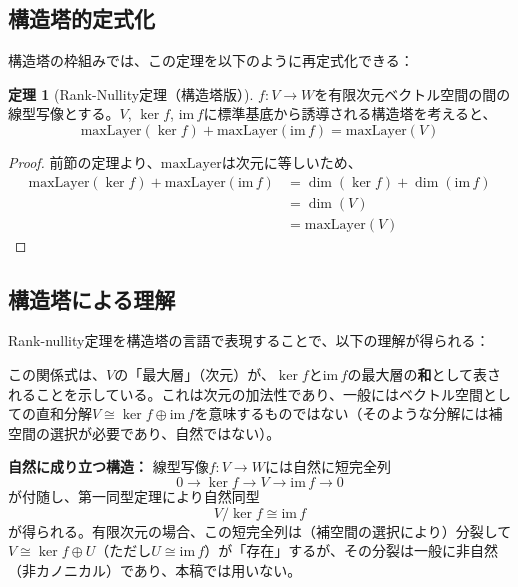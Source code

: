 \documentclass[a4paper,11pt]{ltjsarticle}
\theoremstyle{definition}
\newtheorem{theorem}[definition]{定理}
\begin{document}
\subsection{構造塔的定式化}

構造塔の枠組みでは、この定理を以下のように再定式化できる：

\begin{theorem}[Rank-Nullity定理（構造塔版）]\label{thm:rank_nullity_tower}
$f : V \to W$を有限次元ベクトル空間の間の線型写像とする。$V$, $\ker f$, $\mathrm{im}\, f$に標準基底から誘導される構造塔を考えると、
\[
\mathrm{maxLayer}(\ker f) + \mathrm{maxLayer}(\mathrm{im}\, f) = \mathrm{maxLayer}(V)
\]
\end{theorem}

\begin{proof}
前節の定理より、$\mathrm{maxLayer}$は次元に等しいため、
\begin{align*}
\mathrm{maxLayer}(\ker f) + \mathrm{maxLayer}(\mathrm{im}\, f)
&= \dim(\ker f) + \dim(\mathrm{im}\, f) \\
&= \dim(V) \\
&= \mathrm{maxLayer}(V)
\end{align*}
\end{proof}

\subsection{構造塔による理解}

Rank-nullity定理を構造塔の言語で表現することで、以下の理解が得られる：

\begin{center}
\end{center}

この関係式は、$V$の「最大層」（次元）が、$\ker f$と$\mathrm{im}\, f$の最大層の\textbf{和}として表されることを示している。これは次元の加法性であり、一般にはベクトル空間としての直和分解$V \cong \ker f \oplus \mathrm{im}\, f$を意味するものではない（そのような分解には補空間の選択が必要であり、自然ではない）。

\medskip
\noindent\textbf{自然に成り立つ構造：}
線型写像$f:V\to W$には自然に短完全列
\[
0 \to \ker f \to V \to \mathrm{im}\, f \to 0
\]
が付随し、第一同型定理により自然同型
\[
V/\ker f \cong \mathrm{im}\, f
\]
が得られる。有限次元の場合、この短完全列は（補空間の選択により）分裂して$V \cong \ker f \oplus U$（ただし$U \cong \mathrm{im}\, f$）が「存在」するが、その分裂は一般に非自然（非カノニカル）であり、本稿では用いない。
\medskip
\end{document}
